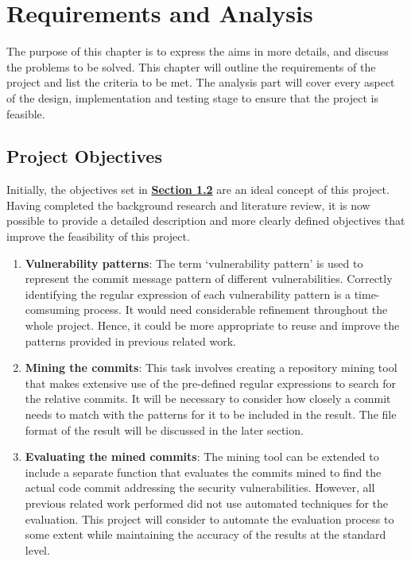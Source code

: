 \documentclass[12pt, a4paper]{report}
\begin{document}
{\chapter{Requirements and Analysis}
The purpose of this chapter is to express the aims in more details, and discuss the problems to be
solved. This chapter will outline the requirements of the project and list the criteria to be met.
The analysis part will cover every aspect of the design, implementation and testing stage to ensure
that the project is feasible.

\section{Project Objectives}
Initially, the objectives set in \hyperref[sec:objectives]{\textbf{Section 1.2}} are an ideal
concept of this project. Having completed the background research and literature review, it is now
possible to provide a detailed description and more clearly defined objectives that improve the
feasibility of this project.

\begin{enumerate}
	\item \textbf{Vulnerability patterns}: The term `vulnerability pattern' is used to represent the
  commit message pattern of different vulnerabilities. Correctly identifying the regular
  expression of each vulnerability pattern is a time-comsuming process. It would need considerable
  refinement throughout the whole project. Hence, it could be more appropriate to reuse and
  improve the patterns provided in previous related work.
	\item \textbf{Mining the commits}: This task involves creating a repository mining tool that makes
	extensive use of the pre-defined regular expressions to search for the relative commits. It will
	be necessary to consider how closely a commit needs to match with the patterns for it to be
	included in the result. The file format of the result will be discussed in the later section.
	\item \textbf{Evaluating the mined commits}: The mining tool can be extended to include a separate
	function that evaluates the commits mined to find the actual code commit addressing the security
	vulnerabilities. However, all previous related work performed did not use automated techniques for
	the evaluation. This project will consider to automate the evaluation process to some extent while
	maintaining the accuracy of the results at the standard level.
\end{enumerate}

}
\end{document}
